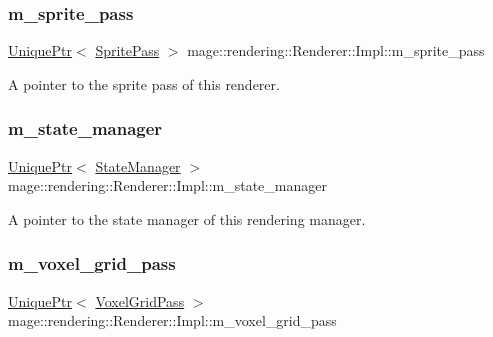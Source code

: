 \subsubsection{\texorpdfstring{m\+\_\+sprite\+\_\+pass}{m\_sprite\_pass}}
{\footnotesize\ttfamily \mbox{\hyperlink{namespacemage_a3316d7143a973e37adf1110f2e80ca31}{Unique\+Ptr}}$<$ \mbox{\hyperlink{classmage_1_1rendering_1_1_sprite_pass}{Sprite\+Pass}} $>$ mage\+::rendering\+::\+Renderer\+::\+Impl\+::m\+\_\+sprite\+\_\+pass\hspace{0.3cm}{\ttfamily [private]}}

A pointer to the sprite pass of this renderer. \mbox{\label{classmage_1_1rendering_1_1_renderer_1_1_impl_a403fbd5958b798e426683c6d671b056c}} 
\subsubsection{\texorpdfstring{m\+\_\+state\+\_\+manager}{m\_state\_manager}}
{\footnotesize\ttfamily \mbox{\hyperlink{namespacemage_a3316d7143a973e37adf1110f2e80ca31}{Unique\+Ptr}}$<$ \mbox{\hyperlink{classmage_1_1rendering_1_1_state_manager}{State\+Manager}} $>$ mage\+::rendering\+::\+Renderer\+::\+Impl\+::m\+\_\+state\+\_\+manager\hspace{0.3cm}{\ttfamily [private]}}

A pointer to the state manager of this rendering manager. \mbox{\label{classmage_1_1rendering_1_1_renderer_1_1_impl_ad0b4ff740d36e1723949213ab5ba74bc}} 
\subsubsection{\texorpdfstring{m\+\_\+voxel\+\_\+grid\+\_\+pass}{m\_voxel\_grid\_pass}}
{\footnotesize\ttfamily \mbox{\hyperlink{namespacemage_a3316d7143a973e37adf1110f2e80ca31}{Unique\+Ptr}}$<$ \mbox{\hyperlink{classmage_1_1rendering_1_1_voxel_grid_pass}{Voxel\+Grid\+Pass}} $>$ mage\+::rendering\+::\+Renderer\+::\+Impl\+::m\+\_\+voxel\+\_\+grid\+\_\+pass\hspace{0.3cm}{\ttfamily [private]}}

